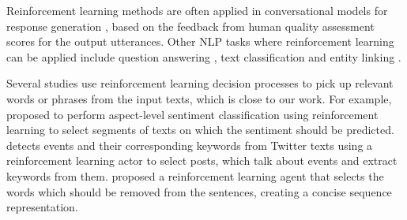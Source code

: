 Reinforcement learning methods are often applied in conversational models for response generation \cite{kandasamy2017batch}, based on the feedback from human quality assessment scores for the output utterances. Other NLP tasks where reinforcement learning can be applied include question answering \cite{qu2019learning, liu2020knowledge}, text classification \cite{zhang2018learning} and entity linking \cite{fang2019joint}. 

Several studies use reinforcement learning decision processes to pick up relevant words or phrases from the input texts, which is close to our work. For example, \citet{wang2019aspect} proposed to perform aspect-level sentiment classification using reinforcement learning to select segments of texts on which the sentiment should be predicted. \citet{chen2018joint} detects events and their corresponding keywords from Twitter texts using a reinforcement learning actor to select posts, which talk about events and extract keywords from them. \citet{zhang2018learning} proposed a reinforcement learning agent that selects the words which should be removed from the sentences, creating a concise sequence representation. %


